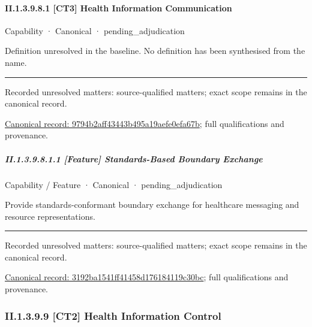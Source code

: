 \paragraph*{II.1.3.9.8.1 [CT3] Health Information Communication}
\label{navigation:II.1.3.9.8.1}

\label{element:9794b2aff43443b495a19aefe0efa67b}
{\small Capability · Canonical · pending\_adjudication}\par

Definition unresolved in the baseline. No definition has been synthesised from the name.



\medskip\hrule\medskip

{\small Recorded unresolved matters: source-qualified matters; exact scope remains in the canonical record.}\par
{\footnotesize \href{../../../../continuum/strategy/capability/9794b2aff43443b495a19aefe0efa67b.md}{Canonical record: 9794b2aff43443b495a19aefe0efa67b}; full qualifications and provenance.}\par
\subparagraph*{II.1.3.9.8.1.1 [Feature] Standards-Based Boundary Exchange}
\label{navigation:II.1.3.9.8.1.1}

\label{element:3192ba1541ff41458d176184119c30bc}
{\small Capability / Feature · Canonical · pending\_adjudication}\par

Provide standards-conformant boundary exchange for healthcare messaging and resource representations.



\medskip\hrule\medskip

{\small Recorded unresolved matters: source-qualified matters; exact scope remains in the canonical record.}\par
{\footnotesize \href{../../../../continuum/strategy/capability/feature/3192ba1541ff41458d176184119c30bc.md}{Canonical record: 3192ba1541ff41458d176184119c30bc}; full qualifications and provenance.}\par
\subsubsection*{II.1.3.9.9 [CT2] Health Information Control}
\label{navigation:II.1.3.9.9}


